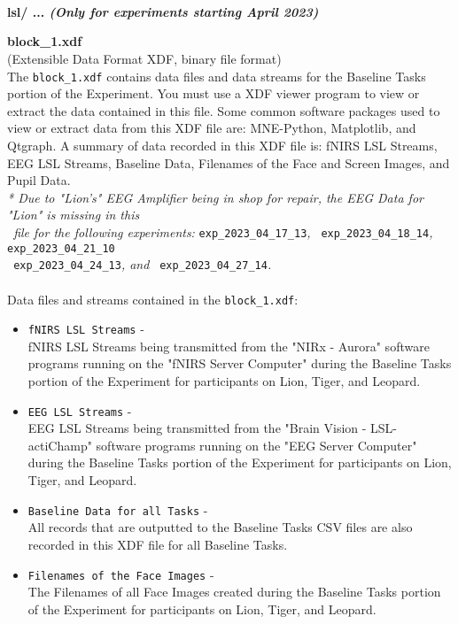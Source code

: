 \begin{description}
\textbf{\\\\\\}
\item\textbf{lsl/ ... \textit{(Only for experiments starting April 2023)}}
\begin{addmargin}[0em]{0em}
    \textbf{block\_1.xdf}\\(Extensible Data Format XDF, binary file format)\\
    The \verb|block_1.xdf| contains data files and data streams for the Baseline Tasks portion of the Experiment.
    You must use a XDF viewer program to view or extract the data contained in this file.
    Some common software packages used to view or extract data from this XDF file are: MNE-Python, Matplotlib, and Qtgraph.
    A summary of data recorded in this XDF file is: fNIRS LSL Streams, EEG LSL Streams, Baseline Data,
    Filenames of the Face and Screen Images, and Pupil Data.\\
    \textit{* Due to "Lion's" EEG Amplifier being in shop for repair, the EEG Data for "Lion" is missing in this}\\
    \verb| |\textit{file for the following experiments: }\verb|exp_2023_04_17_13|\textit{, }\verb| exp_2023_04_18_14|\textit{, }\verb| exp_2023_04_21_10|\\
    \verb| exp_2023_04_24_13|\textit{, and }\verb| exp_2023_04_27_14|\textit{.}\\\\
    Data files and streams contained in the \verb|block_1.xdf|:
    \begin{itemize}
        \item \verb|fNIRS LSL Streams| -\\fNIRS LSL Streams being transmitted from the "NIRx - Aurora" software programs running on the "fNIRS Server Computer" during the Baseline Tasks portion of the Experiment for participants on Lion, Tiger, and Leopard.
        \item \verb|EEG LSL Streams| -\\EEG LSL Streams being transmitted from the "Brain Vision - LSL-actiChamp" software programs running on the "EEG Server Computer" during the Baseline Tasks portion of the Experiment for participants on Lion, Tiger, and Leopard.
        \item \verb|Baseline Data for all Tasks| -\\All records that are outputted to the Baseline Tasks CSV files are also recorded in this XDF file for all Baseline Tasks.
        \item \verb|Filenames of the Face Images| -\\The Filenames of all Face Images created during the Baseline Tasks portion of the Experiment for participants on Lion, Tiger, and Leopard.

\end{itemize}
\end{addmargin}
\end{description}
